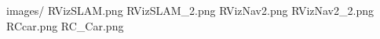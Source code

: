 images/
     RVizSLAM.png
     RVizSLAM\_2.png
     RVizNav2.png
     RVizNav2\_2.png
     RCcar.png
     RC\_Car.png